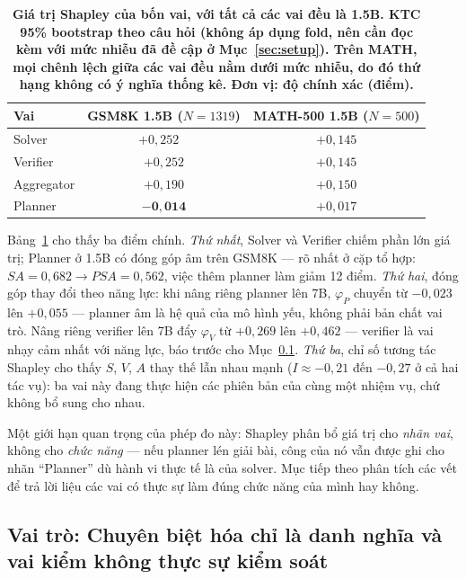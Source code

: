 \documentclass[12pt,a4paper]{article}
\begin{document}
\begin{table}[h]\centering\small
\begin{tabular}{@{}l c c@{}}
\toprule
Vai & GSM8K 1.5B (\(N=1319\)) & MATH-500 1.5B (\(N=500\))\\
\midrule
Solver     & \(+0{,}252\) \ & \(+0{,}145\) \\
Verifier   & \(+0{,}252\)  & \(+0{,}145\)\\
Aggregator & \(+0{,}190\)  & \(+0{,}150\) \\
Planner    & \(\mathbf{-0{,}014}\)  & \(+0{,}017\) \\
\bottomrule
\end{tabular}
\caption{\textbf{Giá trị Shapley của bốn vai, với tất cả các vai đều là 1.5B. KTC 95\% bootstrap theo câu hỏi (không áp dụng fold, nên cần đọc kèm với mức nhiễu đã đề cập ở Mục~\ref{sec:setup}). Trên MATH, mọi chênh lệch giữa các vai đều nằm dưới mức nhiễu, do đó thứ hạng không có ý nghĩa thống kê. Đơn vị: độ chính xác (điểm).}}
\label{tab:shapley}
\end{table}

Bảng~\ref{tab:shapley} cho thấy ba điểm chính. \textit{Thứ nhất}, Solver và Verifier chiếm phần lớn giá trị; Planner ở 1.5B có đóng góp âm trên GSM8K --- rõ nhất ở cặp tổ hợp: \(SA = 0{,}682 \to PSA = 0{,}562\), việc thêm planner làm giảm 12 điểm. \textit{Thứ hai}, đóng góp thay đổi theo năng lực: khi nâng riêng planner lên 7B, \(\varphi_P\) chuyển từ \(-0{,}023\) lên \(+0{,}055\)  --- planner âm là hệ quả của mô hình yếu, không phải bản chất vai trò. Nâng riêng verifier lên 7B đẩy \(\varphi_V\) từ \(+0{,}269\) lên \(+0{,}462\) --- verifier là vai nhạy cảm nhất với năng lực, báo trước cho Mục~\ref{sec:roles}. \textit{Thứ ba}, chỉ số tương tác Shapley cho thấy \(S\), \(V\), \(A\) thay thế lẫn nhau mạnh (\(I \approx -0{,}21\) đến \(-0{,}27\) ở cả hai tác vụ): ba vai này đang thực hiện các phiên bản của cùng một nhiệm vụ, chứ không bổ sung cho nhau.

Một giới hạn quan trọng của phép đo này: Shapley phân bổ giá trị cho \textit{nhãn vai}, không cho \textit{chức năng} --- nếu planner lén giải bài, công của nó vẫn được ghi cho nhãn ``Planner'' dù hành vi thực tế là của solver. Mục tiếp theo phân tích các vết để trả lời liệu các vai có thực sự làm đúng chức năng của mình hay không.

\subsection{Vai trò: Chuyên biệt hóa chỉ là danh nghĩa và vai kiểm không thực sự kiểm soát}\label{sec:roles}
\end{document}
